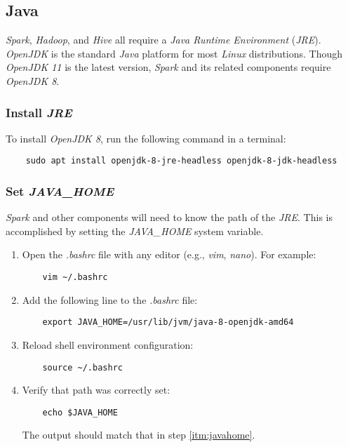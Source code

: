 \documentclass{article}
\begin{document}
  \subsection{Java}
  \emph{Spark}, \emph{Hadoop}, and \emph{Hive} all require a \emph{Java Runtime Environment}
  (\emph{JRE}). \emph{OpenJDK} is the standard \emph{Java} platform for most \emph{Linux}
  distributions. Though \emph{OpenJDK 11} is the latest version, \emph{Spark} and its related
  components require \emph{OpenJDK 8}.

    \subsubsection{Install \emph{JRE}}
    To install \emph{OpenJDK 8}, run the following command in a terminal:
    \begin{verbatim}
    sudo apt install openjdk-8-jre-headless openjdk-8-jdk-headless  
    \end{verbatim}

    \subsubsection{Set \emph{JAVA\_HOME}}
    \label{subsec:javahome}
    \emph{Spark} and other components will need to know the path of the
    \emph{JRE}. This is accomplished by setting the \emph{JAVA\_HOME}
    system variable.

    \begin{enumerate}
    \item Open the \emph{.bashrc} file with any editor (e.g., \emph{vim}, \emph{nano}).
    For example:
    \begin{verbatim}
    vim ~/.bashrc
    \end{verbatim}
    
    \item Add the following line to the \emph{.bashrc} file:
    \label{itm:javahome}
    \begin{verbatim}
    export JAVA_HOME=/usr/lib/jvm/java-8-openjdk-amd64                 
    \end{verbatim}
    
    \item Reload shell environment configuration:
    \begin{verbatim}
    source ~/.bashrc
    \end{verbatim}
    
    \item Verify that path was correctly set:
    \begin{verbatim}
    echo $JAVA_HOME
    \end{verbatim}
    The output should match that in step \ref{itm:javahome}.
    \end{enumerate}
\end{document}
